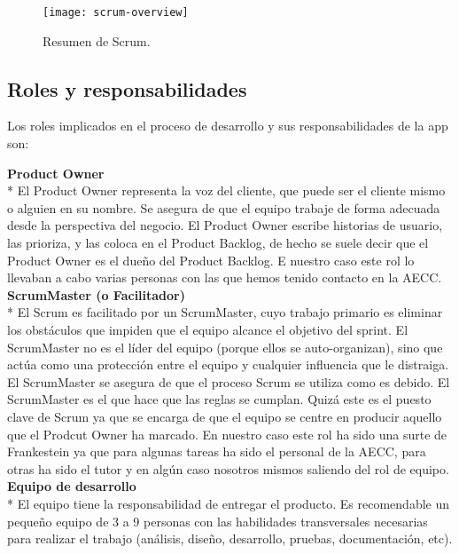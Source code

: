 \documentclass[../pfc.tex]{subfiles}
\begin{document}
		\begin{figure}[h]
			\centering
			\texttt{[image: scrum-overview]}
			\caption{Resumen de Scrum.}
			\label{fig:Resumen de Scrum}
		\end{figure}
	
	\subsection{Roles y responsabilidades}
	Los roles  implicados en el proceso de desarrollo y sus responsabilidades   de la app son:

	\textbf{Product Owner}\\*
	El Product Owner representa la voz del cliente, que puede ser el cliente mismo o alguien en su nombre. Se asegura de que el equipo trabaje de forma adecuada desde la perspectiva del negocio. El Product Owner escribe historias de usuario, las prioriza, y las coloca en el Product Backlog, de hecho se suele decir que el Product Owner es el dueño del Product Backlog. E nuestro caso este rol lo llevaban a cabo varias personas con las que hemos tenido contacto en la AECC.\\
	
	\textbf{ScrumMaster (o Facilitador)}\\*
	El Scrum es facilitado por un ScrumMaster, cuyo trabajo primario es eliminar los obstáculos que impiden que el equipo alcance el objetivo del sprint. El ScrumMaster no es el líder del equipo (porque ellos se auto-organizan), sino que actúa como una protección entre el equipo y cualquier influencia que le distraiga. El ScrumMaster se asegura de que el proceso Scrum se utiliza como es debido. El ScrumMaster es el que hace que las reglas se cumplan. Quizá este es el puesto clave de Scrum ya que se encarga de que el equipo se centre en producir aquello que el Prodcut Owner ha marcado. En nuestro caso este rol ha sido una surte de Frankestein ya que para algunas tareas ha sido el personal de la AECC, para otras ha sido el tutor y en algún caso nosotros mismos saliendo del rol de equipo. \\
	
	\textbf{Equipo de desarrollo}\\*
	El equipo tiene la responsabilidad de entregar el producto. Es recomendable un pequeño equipo de 3 a 9 personas con las habilidades transversales necesarias para realizar el trabajo (análisis, diseño, desarrollo, pruebas, documentación, etc).\\
	
\end{document}
